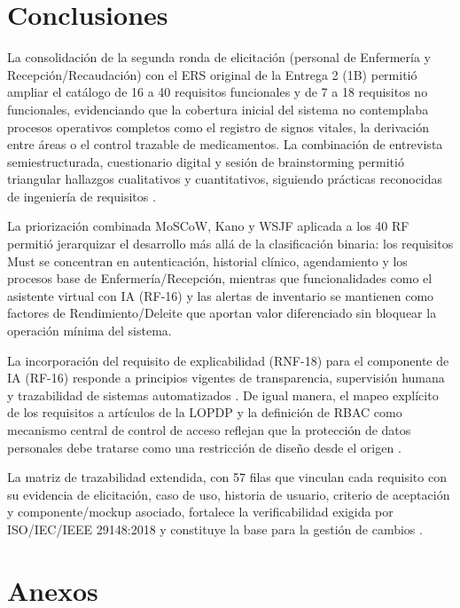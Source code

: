 \documentclass[11pt,a4paper]{article}
\begin{document}
	
	
	
	\section{Conclusiones}
	
	La consolidación de la segunda ronda de elicitación (personal de Enfermería y Recepción/Recaudación) con el ERS original de la Entrega 2 (1B) permitió ampliar el catálogo de 16 a 40 requisitos funcionales y de 7 a 18 requisitos no funcionales, evidenciando que la cobertura inicial del sistema no contemplaba procesos operativos completos como el registro de signos vitales, la derivación entre áreas o el control trazable de medicamentos. La combinación de entrevista semiestructurada, cuestionario digital y sesión de brainstorming permitió triangular hallazgos cualitativos y cuantitativos, siguiendo prácticas reconocidas de ingeniería de requisitos \cite{iso29148,nuseibeh2000,pohl2010}.
	
	La priorización combinada MoSCoW, Kano y WSJF aplicada a los 40 RF permitió jerarquizar el desarrollo más allá de la clasificación binaria: los requisitos Must se concentran en autenticación, historial clínico, agendamiento y los procesos base de Enfermería/Recepción, mientras que funcionalidades como el asistente virtual con IA (RF-16) y las alertas de inventario se mantienen como factores de Rendimiento/Deleite que aportan valor diferenciado sin bloquear la operación mínima del sistema.
	
	La incorporación del requisito de explicabilidad (RNF-18) para el componente de IA (RF-16) responde a principios vigentes de transparencia, supervisión humana y trazabilidad de sistemas automatizados \cite{whoai2021,euaiact2024,fda2022}. De igual manera, el mapeo explícito de los requisitos a artículos de la LOPDP y la definición de RBAC como mecanismo central de control de acceso reflejan que la protección de datos personales debe tratarse como una restricción de diseño desde el origen \cite{loppd,iso27799,sandhu2000}.
	
	La matriz de trazabilidad extendida, con 57 filas que vinculan cada requisito con su evidencia de elicitación, caso de uso, historia de usuario, criterio de aceptación y componente/mockup asociado, fortalece la verificabilidad exigida por ISO/IEC/IEEE 29148:2018 y constituye la base para la gestión de cambios \cite{iso29148,gotel1994,ramesh2001,clelandhuang2003}.
	
	
	
	
	\section{Anexos}
	
\end{document}
